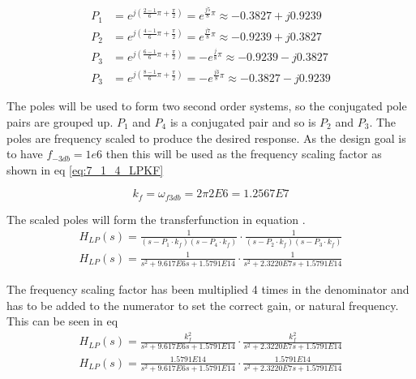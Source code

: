 \begin{equation}\label{eq:7_1_4_LPPoles1} 
    \begin{aligned}
        P_1 &= e^{j\left(\frac{2-1}{6}\pi + \frac{\pi}{2}\right)} = e^{\frac{j5}{8}\pi} \approx -0.3827 + j0.9239 \\
        P_2 &= e^{j\left(\frac{4-1}{6}\pi + \frac{\pi}{2}\right)} = e^{\frac{j7}{8}\pi} \approx -0.9239 + j0.3827 \\
        P_3 &= e^{j\left(\frac{6-1}{6}\pi + \frac{\pi}{2}\right)} = -e^{\frac{j}{8}\pi} \approx -0.9239 - j0.3827  \\
        P_3 &= e^{j\left(\frac{8-1}{6}\pi + \frac{\pi}{2}\right)} = -e^{\frac{j3}{8}\pi}\approx -0.3827 - j0.9239 
    \end{aligned}
\end{equation}

The poles will be used to form two second order systems, so the conjugated pole pairs are grouped up. $P_1$ and $P_4$ is a conjugated pair and so is $P_2$ and $P_3$. The poles are frequency scaled to produce the desired response. As the design goal is to have $f_{-3db} = 1e6$ then this will be used as the frequency scaling factor as shown in eq \ref{eq:7_1_4_LPKF}

\begin{equation}\label{eq:7_1_4_LPKF}
    k_f = \omega_{f3db} = 2\pi 2E6 = 1.2567E7
\end{equation}

The scaled poles will form the transferfunction in equation .
\begin{equation}\label{eq:7_1_4_LPTF}
    \begin{aligned}
    H_{LP}(s) = \frac{1}{(s-P_1\cdot k_f)(s-P_4\cdot k_f)  }\cdot \frac{1}{(s-P_2\cdot k_f)(s-P_3\cdot k_f)}\\
    H_{LP}(s) = \frac{1}{s^2 + 9.617E6s + 1.5791E14}\cdot \frac{1}{s^2 + 2.3220E7s + 1.5791E14}
\end{aligned}
\end{equation}

The frequency scaling factor has been multiplied 4 times in the denominator and has to be added to the numerator to set the correct gain, or natural frequency. This can be seen in eq 
\begin{equation}\label{eq:7_1_4_LPTFKFSQ}
    \begin{aligned}
        H_{LP}(s) = \frac{k_f^2}{s^2 + 9.617E6s + 1.5791E14}\cdot \frac{k_f^2}{s^2 + 2.3220E7s + 1.5791E14}\\
    H_{LP}(s) = \frac{1.5791E14}{s^2 + 9.617E6s + 1.5791E14}\cdot \frac{1.5791E14}{s^2 + 2.3220E7s + 1.5791E14}
\end{aligned}
\end{equation}

